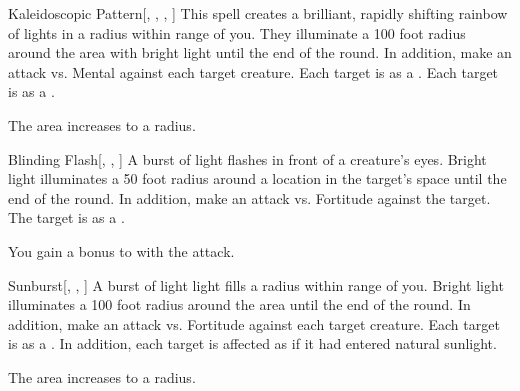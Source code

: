 \lowercase{\hypertarget{spell:Kaleidoscopic Pattern}{}}\label{spell:Kaleidoscopic Pattern}
\begin{freeability}[Rank 5]{\hypertarget{spell:Kaleidoscopic Pattern}{Kaleidoscopic Pattern}}[, , , ]
This spell creates a brilliant, rapidly shifting rainbow of lights in a \areasmall radius within \rngmed range of you.
They illuminate a 100 foot radius around the area with bright light until the end of the round.
In addition, make an attack vs. Mental against each target creature.
\hit Each target is \dazed as a .
\crit Each target is \disoriented as a .

\rankline
{} The area increases to a \areamed radius.
\end{freeability}
\vspace{0.25em}



\lowercase{\hypertarget{spell:Blinding Flash}{}}\label{spell:Blinding Flash}
\begin{freeability}[Rank 6]{\hypertarget{spell:Blinding Flash}{Blinding Flash}}[, , ]
A burst of light flashes in front of a creature's eyes.
Bright light illuminates a 50 foot radius around a location in the target's space until the end of the round.
In addition, make an attack vs. Fortitude against the target.
\hit The target is  as a .

\rankline
{} You gain a  bonus to  with the attack.
\end{freeability}
\vspace{0.25em}



\lowercase{\hypertarget{spell:Sunburst}{}}\label{spell:Sunburst}
\begin{freeability}[Rank 6]{\hypertarget{spell:Sunburst}{Sunburst}}[, , ]
A burst of light light fills a \areamed radius  within \rngmed range of you.
Bright light illuminates a 100 foot radius around the area until the end of the round.
In addition, make an attack vs. Fortitude against each target creature.
\hit Each target is \dazzled as a .
In addition, each target is affected as if it had entered natural sunlight.

\rankline
{} The area increases to a \arealarge radius.
\end{freeability}
\vspace{0.25em}



